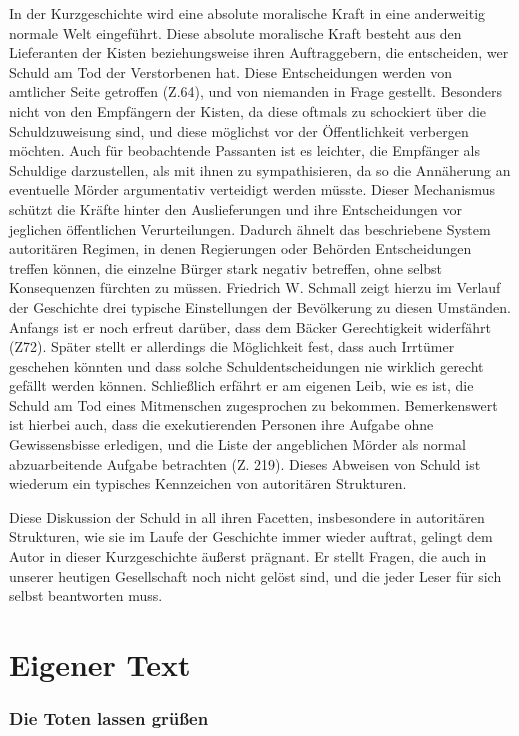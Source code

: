 In der Kurzgeschichte wird eine absolute moralische Kraft in eine anderweitig normale Welt eingeführt. Diese absolute moralische Kraft besteht aus den Lieferanten der Kisten beziehungsweise ihren Auftraggebern, die entscheiden, wer Schuld am Tod der Verstorbenen hat. Diese Entscheidungen werden von amtlicher Seite getroffen (Z.64), und von niemanden in Frage gestellt. Besonders nicht von den Empfängern der Kisten, da diese oftmals zu schockiert über die Schuldzuweisung sind, und diese möglichst vor der Öffentlichkeit verbergen möchten. Auch für beobachtende Passanten ist es leichter, die Empfänger als Schuldige darzustellen, als mit ihnen zu sympathisieren, da so die Annäherung an eventuelle Mörder argumentativ verteidigt werden müsste. Dieser Mechanismus schützt die Kräfte hinter den Auslieferungen und ihre Entscheidungen vor jeglichen öffentlichen Verurteilungen. Dadurch ähnelt das beschriebene System autoritären Regimen, in denen Regierungen oder Behörden Entscheidungen treffen können, die einzelne Bürger stark negativ betreffen, ohne selbst Konsequenzen fürchten zu müssen. Friedrich W. Schmall zeigt hierzu im Verlauf der Geschichte drei typische Einstellungen der Bevölkerung zu diesen Umständen. Anfangs ist er noch erfreut darüber, dass dem Bäcker Gerechtigkeit widerfährt (Z72). Später stellt er allerdings die Möglichkeit fest, dass auch Irrtümer geschehen könnten und dass solche Schuldentscheidungen nie wirklich gerecht gefällt werden können. Schließlich erfährt er am eigenen Leib, wie es ist, die Schuld am Tod eines Mitmenschen zugesprochen zu bekommen. Bemerkenswert ist hierbei auch, dass die exekutierenden Personen ihre Aufgabe ohne Gewissensbisse erledigen, und die Liste der angeblichen Mörder als normal abzuarbeitende Aufgabe betrachten (Z. 219). Dieses Abweisen von Schuld ist wiederum ein typisches Kennzeichen von autoritären Strukturen. 

Diese Diskussion der Schuld in all ihren Facetten, insbesondere in autoritären Strukturen, wie sie im Laufe der Geschichte immer wieder auftrat, gelingt dem Autor in dieser Kurzgeschichte äußerst prägnant. Er stellt Fragen, die auch in unserer heutigen Gesellschaft noch nicht gelöst sind, und die jeder Leser für sich selbst beantworten muss. 

\section{Eigener Text}
\subsubsection{Die Toten lassen grüßen }

